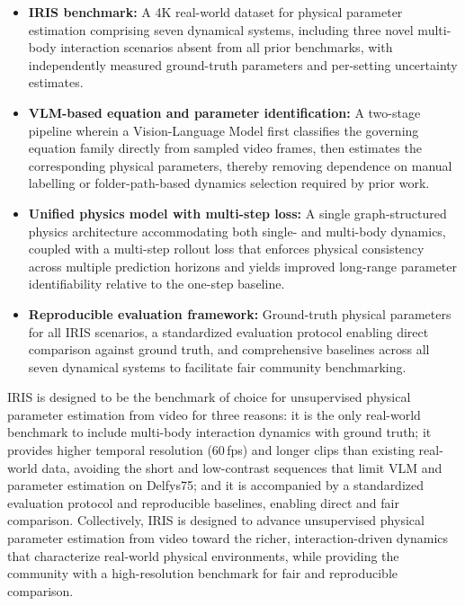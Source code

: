 \documentclass[runningheads]{llncs}
\begin{document}
\begin{itemize}
    \item \textbf{IRIS benchmark:} A 4K real-world dataset for physical parameter estimation comprising seven dynamical systems, including three novel multi-body interaction scenarios absent from all prior benchmarks, with independently measured ground-truth parameters and per-setting uncertainty estimates.
    \item \textbf{VLM-based equation and parameter identification:} A two-stage pipeline wherein a Vision-Language Model first classifies the governing equation family directly from sampled video frames, then estimates the corresponding physical parameters, thereby removing dependence on manual labelling or folder-path-based dynamics selection required by prior work.
    \item \textbf{Unified physics model with multi-step loss:} A single graph-structured physics architecture accommodating both single- and multi-body dynamics, coupled with a multi-step rollout loss that enforces physical consistency across multiple prediction horizons and yields improved long-range parameter identifiability relative to the one-step baseline.
    \item \textbf{Reproducible evaluation framework:} Ground-truth physical parameters for all IRIS scenarios, a standardized evaluation protocol enabling direct comparison against ground truth, and comprehensive baselines across all seven dynamical systems to facilitate fair community benchmarking.
\end{itemize}

IRIS is designed to be the benchmark of choice for unsupervised physical parameter estimation from video for three reasons: it is the only real-world benchmark to include multi-body interaction dynamics with ground truth; it provides higher temporal resolution (60\,fps) and longer clips than existing real-world data, avoiding the short and low-contrast sequences that limit VLM and parameter estimation on Delfys75; and it is accompanied by a standardized evaluation protocol and reproducible baselines, enabling direct and fair comparison. Collectively, IRIS is designed to advance unsupervised physical parameter estimation from video toward the richer, interaction-driven dynamics that characterize real-world physical environments, while providing the community with a high-resolution benchmark for fair and reproducible comparison.


\end{document}
